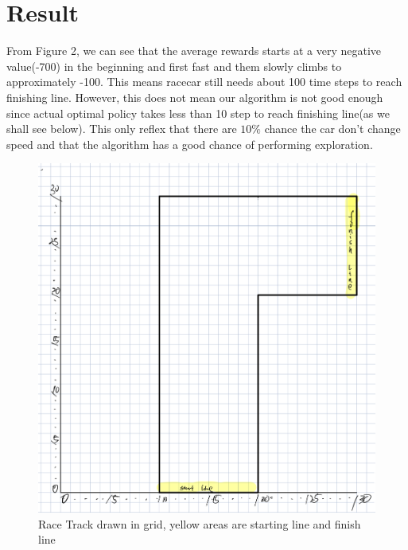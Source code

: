 \documentclass[12pt]{article}
\begin{document}
\section{Result}
From Figure 2, we can see that the average rewards starts at a very negative value(-700) in the beginning and first fast and them slowly climbs to approximately -100.  This means racecar still needs about 100 time steps to reach finishing line. However, this does not mean our algorithm is not good enough since actual optimal policy takes less than 10 step to reach finishing line(as we shall see below). This only reflex that there are $10\%$ chance the car don't change speed and that the algorithm has a good chance of performing exploration.
\begin{figure}
  \centering
     \includegraphics[scale = 0.16]{4.png}
  \caption{Race Track drawn in grid, yellow areas are starting line and finish line}
\end{figure}
\end{document}
